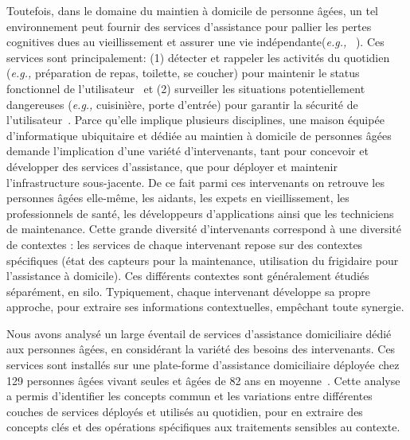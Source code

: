 Toutefois, dans le domaine du maintien à domicile de personne âgées, un tel environnement peut fournir
des services d’assistance pour pallier les pertes cognitives dues au vieillissement et assurer une vie
indépendante({\em e.g.,} ~\cite{rashidi2013survey}). Ces services sont principalement: (1) détecter et rappeler les activités du quotidien ({\em e.g.,} préparation de repas, toilette, se coucher) pour maintenir le status fonctionnel de l'utilisateur~\cite{caroux2014verification} et (2) surveiller les situations potentiellement dangereuses ({\em e.g.,} cuisinière, porte d'entrée) pour garantir la sécurité de l'utilisateur~\cite{rashidi2013survey}. 
Parce qu’elle implique plusieurs disciplines, une maison équipée d’informatique ubiquitaire et
dédiée au maintien à domicile de personnes âgées demande l’implication d’une variété d’intervenants, tant pour concevoir et développer des services d’assistance, que pour déployer et maintenir l’infrastructure sous-jacente. De ce fait parmi ces intervenants on retrouve les personnes âgées elle-même, les aidants, les expets en vieillissement, les professionnels de santé, les développeurs d'applications ainsi que les techniciens de maintenance. 
Cette grande diversité d’intervenants correspond à une diversité
de contextes : les services de chaque intervenant repose sur des contextes spécifiques (état des
capteurs pour la maintenance, utilisation du frigidaire pour l’assistance à domicile). Ces différents
contextes sont généralement étudiés séparément, en silo. Typiquement, chaque intervenant développe sa propre approche, pour extraire ses informations contextuelles, empêchant toute synergie.

Nous avons analysé un large éventail de services d'assistance domiciliaire dédié aux personnes âgées, en considérant la variété des besoins des intervenants. Ces services sont installés sur une plate-forme d'assistance domiciliaire déployée chez 129 personnes âgées vivant seules et âgées de 82 ans en moyenne~\cite{consel2017homeassist}. 
Cette analyse a permis d'identifier les concepts commun et les variations
entre différentes couches de services déployés et utilisés au quotidien,
pour en extraire des concepts clés et des opérations spécifiques aux
traitements sensibles au contexte.


